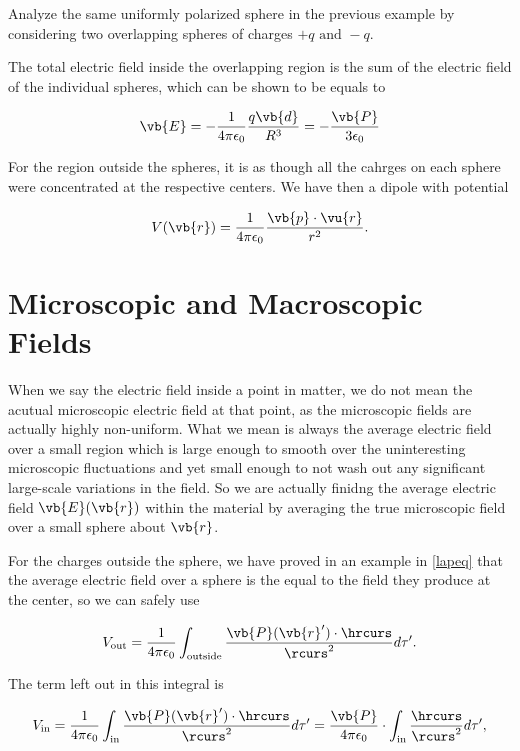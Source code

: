 \documentclass[english,a4paper,12pt]{report}
\begin{document}
{Analyze the same uniformly polarized sphere in the previous example by considering two overlapping spheres of charges \(+q\text { and } -q\).}
{The total electric field inside the overlapping region is the sum of the electric field of the individual spheres, which can be shown to be equals to

\begin{equation}
    \vb{E} = -\frac{1}{4\pi \epsilon_0} \frac{q\vb{d} }{R^3 } = -\frac{\vb{P} }{3\epsilon _{0} } 
\end{equation}

For the region outside the spheres, it is as though all the cahrges on each sphere were concentrated at the respective centers. We have then a dipole with potential 

\begin{equation}
    V(\vb{r} ) = \frac{1}{4\pi \epsilon_0} \frac{\vb{p} \cdot \vu{r} }{r^2}. 
\end{equation}
} 

\section{Microscopic and Macroscopic Fields}

When we say the electric field inside a point in matter, we do not mean the acutual microscopic electric field at that point, as the microscopic fields are actually highly non-uniform. What we mean is always the average electric field over a small region which is large enough to smooth over the uninteresting microscopic fluctuations and yet small enough to not wash out any significant large-scale variations in the field. So we are actually finidng the average electric field \(\vb{E} (\vb{r} )\) within the material by averaging the true microscopic field over a small sphere about \(\vb{r} \).

For the charges outside the sphere, we have proved in an example in \cref{lapeq} that the average electric field over a sphere is the equal to the field they produce at the center, so we can safely use

\begin{equation}
    V_{\text{out} } = \frac{1}{4\pi \epsilon_0} \int_{\text{outside} }^{} \frac{\vb{P} (\vb{r} ') \cdot \hrcurs }{\rcurs ^2} d\tau '.   
\end{equation}

The term left out in this integral is 

\begin{equation}
    V_{\text{in} } = \frac{1}{4\pi \epsilon_0} \int_{\text{in} }^{} \frac{\vb{P} (\vb{r} ') \cdot \hrcurs }{\rcurs ^2} d\tau ' = \frac{\vb{P} }{4\pi \epsilon_0} \cdot \int_{\text{in} }^{} \frac{\hrcurs }{\rcurs ^2}d\tau ',    
\end{equation}
\end{document}
